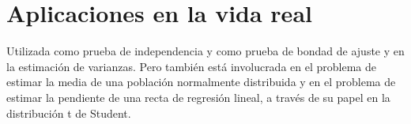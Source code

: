 \section{Aplicaciones en la vida real}
Utilizada como prueba de independencia y como prueba de bondad de ajuste y en la estimación de varianzas. Pero también está involucrada en el problema de estimar la media de una población normalmente distribuida y en el problema de estimar la pendiente de una recta de regresión lineal, a través de su papel en la distribución t de Student.